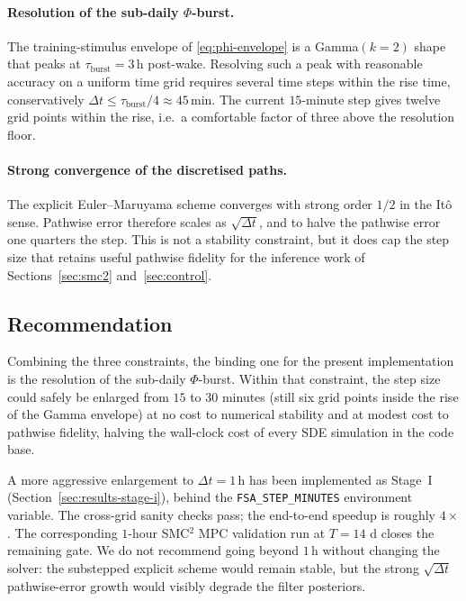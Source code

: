 \paragraph{Resolution of the sub-daily $\Phi$-burst.} The
training-stimulus envelope of \eqref{eq:phi-envelope} is a
Gamma$(k=2)$ shape that peaks at
$\tau_{\mathrm{burst}} = 3\,\mathrm{h}$ post-wake. Resolving such a
peak with reasonable accuracy on a uniform time grid requires
several time steps within the rise time, conservatively
$\Delta t \le \tau_{\mathrm{burst}}/4 \approx 45\,\mathrm{min}$. The
current $15$-minute step gives twelve grid points within the rise,
i.e.\ a comfortable factor of three above the resolution floor.

\paragraph{Strong convergence of the discretised paths.} The
explicit Euler--Maruyama scheme converges with strong order $1/2$
in the It\^o sense. Pathwise error therefore scales as
$\sqrt{\Delta t}$, and to halve the pathwise error one quarters the
step. This is not a stability constraint, but it does cap the
step size that retains useful pathwise fidelity for the inference
work of Sections~\ref{sec:smc2} and~\ref{sec:control}.

\subsection{Recommendation}\label{sec:num-stab-recommend}

Combining the three constraints, the binding one for the present
implementation is the resolution of the sub-daily $\Phi$-burst.
Within that constraint, the step size could safely be enlarged from
$15$ to $30$ minutes (still six grid points inside the rise of the
Gamma envelope) at no cost to numerical stability and at modest
cost to pathwise fidelity, halving the wall-clock cost of every
SDE simulation in the code base.

A more aggressive enlargement to $\Delta t = 1\,\mathrm{h}$ has been
implemented as Stage~I (Section~\ref{sec:results-stage-i}), behind
the \texttt{FSA\_STEP\_MINUTES} environment variable. The cross-grid
sanity checks pass; the end-to-end speedup is roughly $4\times$.
The corresponding $1$-hour SMC${}^2$ MPC validation run at $T = 14$ d
closes the remaining gate. We do not
recommend going beyond $1\,\mathrm{h}$ without changing the solver:
the substepped explicit scheme would remain stable, but the strong
$\sqrt{\Delta t}$ pathwise-error growth would visibly degrade the
filter posteriors.

